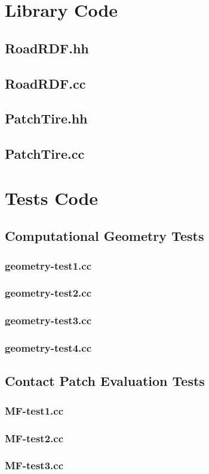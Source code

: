 \chapter{Library Code}
\label{LibraryCode}
%
\section{RoadRDF.hh}

%
\section{RoadRDF.cc}

%
\section{PatchTire.hh}

%
\section{PatchTire.cc}

%
\chapter{Tests Code}
\label{TestsCode}
%
\section{Computational Geometry Tests}
%
\subsection{geometry-test1.cc}

%
\subsection{geometry-test2.cc}

%
\subsection{geometry-test3.cc}

%
\subsection{geometry-test4.cc}

%
\section{Contact Patch Evaluation Tests}
%
\subsection{MF-test1.cc}

%
\subsection{MF-test2.cc}

%
\subsection{MF-test3.cc}
